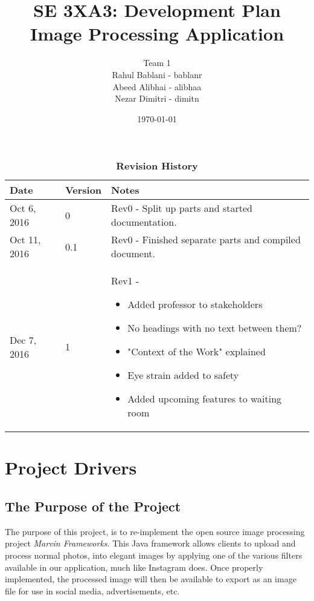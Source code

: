 \documentclass[12pt, titlepage]{article}
\title{SE 3XA3: Development Plan\\Image Processing Application}
\author{Team 1 \1
		\\ Rahul Bablani - bablanr
		\\ Abeed Alibhai - alibhaa
		\\ Nezar Dimitri - dimitn
}
\date{\today}
\begin{document}
\maketitle

\tableofcontents
\listoftables
\listoffigures

\begin{table}[htbp]
\caption{\bf Revision History}
\begin{tabularx}{\textwidth}{p{3cm}p{2cm}X}
\toprule {\bf Date} & {\bf Version} & {\bf Notes}\\
\midrule
Oct 6, 2016 & 0 & Rev0 - Split up parts and started documentation.\\
Oct 11, 2016 & 0.1 & Rev0 - Finished separate parts and compiled document.\\
Dec 7, 2016 & 1 & Rev1 - 
\begin{itemize}
	\item Added professor to stakeholders
	\item No headings with no text between them?
	\item "Context of the Work" explained
	\item Eye strain added to safety
	\item Added upcoming features to waiting room
\end{itemize}


\end{tabularx}
\end{table}

\clearpage


\section{Project Drivers}

\subsection{The Purpose of the Project}

The purpose of this project, is to re-implement the open source image processing project \textit{Marvin Frameworks}. This Java framework allows clients to upload and process normal photos, into elegant images by applying one of the various filters available in our application, much like Instagram does. Once properly implemented, the processed image will then be available to export as an image file for use in social media, advertisements, etc.
\end{document}
